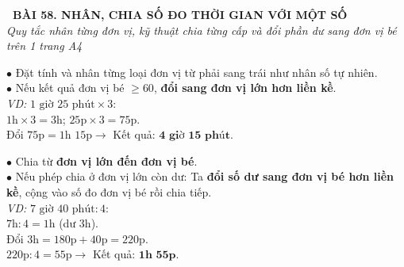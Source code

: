 \documentclass[14pt,a4paper,oneside]{extbook}
\begin{document}
\noindent
\begin{tcolorbox}[
  enhanced,
  colback=teal!8!white,
  colframe=teal!80!black,
  arc=3mm,
  boxrule=1.1pt,
  width=\linewidth,
  halign=center,
  top=2.2mm, bottom=2.2mm,
  left=3mm, right=3mm,
  drop fuzzy shadow
]
  {\large\bfseries\color{teal!95!black}\faBookmark\ BÀI 58. NHÂN, CHIA SỐ ĐO THỜI GIAN VỚI MỘT SỐ}\\[2pt]
  {\scriptsize\color{black!75}\itshape Quy tắc nhân từng đơn vị, kỹ thuật chia từng cấp và đổi phần dư sang đơn vị bé trên 1 trang A4}
\end{tcolorbox}

\vspace{3.2mm}
\noindent
\begin{minipage}[t]{0.50\textwidth}
  \begin{tcolorbox}[
    enhanced,
    title={\footnotesize\bfseries\color{white}\faTimes\ 1. Nhân số đo thời gian với một số},
    colback=blue!2!white,
    colframe=blue!75!black,
    arc=2.5mm, boxrule=0.8pt, top=1.8mm, bottom=1.8mm, left=2.2mm, right=2.2mm
  ]
    \footnotesize
    $\bullet$ Đặt tính và nhân từng loại đơn vị từ phải sang trái như nhân số tự nhiên.\\
    $\bullet$ Nếu kết quả đơn vị bé $\ge 60$, \textbf{đổi sang đơn vị lớn hơn liền kề}.\\
    \textit{VD:} $1\text{ giờ } 25\text{ phút} \times 3$:\\
    $1\text{h} \times 3 = 3\text{h}$; $25\text{p} \times 3 = 75\text{p}$.\\
    Đổi $75\text{p} = 1\text{h } 15\text{p} \rightarrow$ Kết quả: $\mathbf{4\text{ giờ } 15\text{ phút}}$.
  \end{tcolorbox}
\end{minipage}%
\hfill
\begin{minipage}[t]{0.48\textwidth}
  \begin{tcolorbox}[
    enhanced,
    title={\footnotesize\bfseries\color{white}\faDivide\ 2. Chia số đo thời gian cho một số},
    colback=teal!2!white,
    colframe=teal!75!black,
    arc=2.5mm, boxrule=0.8pt, top=1.8mm, bottom=1.8mm, left=2mm, right=2mm
  ]
    \footnotesize
    $\bullet$ Chia từ \textbf{đơn vị lớn đến đơn vị bé}.\\
    $\bullet$ Nếu phép chia ở đơn vị lớn còn dư: Ta \textbf{đổi số dư sang đơn vị bé hơn liền kề}, cộng vào số đo đơn vị bé rồi chia tiếp.\\
    \textit{VD:} $7\text{ giờ } 40\text{ phút} : 4$:\\
    $7\text{h} : 4 = 1\text{h}$ (dư $3\text{h}$).\\
    Đổi $3\text{h} = 180\text{p} + 40\text{p} = 220\text{p}$.\\
    $220\text{p} : 4 = 55\text{p} \rightarrow$ Kết quả: $\mathbf{1\text{h } 55\text{p}}$.
  \end{tcolorbox}
\end{minipage}
\end{document}

